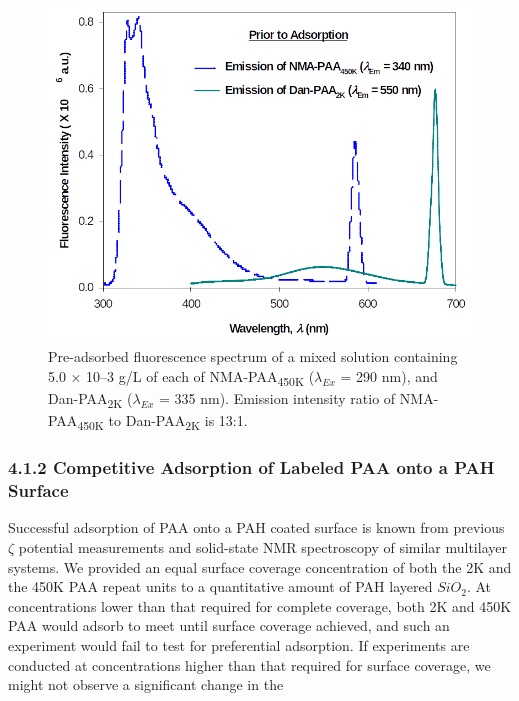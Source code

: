 \documentclass[journal=mamobx,manuscript=article]{achemso}
\begin{document}
\begin{figure}[H]
\includegraphics[scale=2.0]{fig3.png}
\caption{Pre-adsorbed fluorescence spectrum of a mixed solution containing 5.0 × 10–3 g/L of each of NMA-PAA\textsubscript{450K} ($\lambda_{Ex}$ = 290 nm), and Dan-PAA\textsubscript{2K} ($\lambda_{Ex}$ = 335 nm).  Emission intensity ratio of NMA-PAA\textsubscript{450K} to Dan-PAA\textsubscript{2K}  is 13:1.}
\label{figure 3}
\end{figure}

\subsubsection{4.1.2 Competitive Adsorption of Labeled PAA onto a PAH Surface}

Successful adsorption of PAA onto a PAH coated surface is known from previous $\zeta$ potential measurements and solid-state NMR spectroscopy of similar multilayer systems.\cite{Burke2003,Smith2004}  We provided an equal surface coverage concentration of both the 2K and the 450K PAA repeat units to a quantitative amount of PAH layered $SiO_2$.  At concentrations lower than that required for complete coverage, both 2K and 450K PAA would adsorb to meet until surface coverage achieved, and such an experiment would fail to test for preferential adsorption.  If experiments are conducted at concentrations higher than that required for surface coverage, we might not observe a significant change in the 
\end{document}
